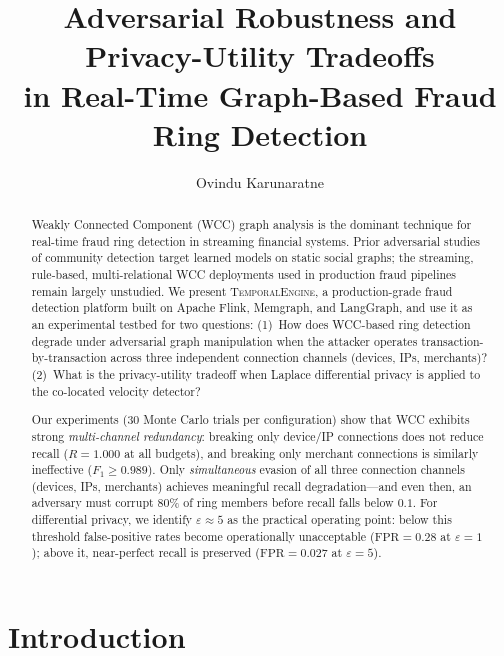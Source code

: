 \documentclass[sigconf,nonacm]{acmart}
\title{Adversarial Robustness and Privacy-Utility Tradeoffs\\
       in Real-Time Graph-Based Fraud Ring Detection}
\author{Ovindu Karunaratne}
\affiliation{%
  \institution{Independent Research}
  \country{}
}
\newcommand{\sysname}{\textsc{TemporalEngine}\xspace}
\newcommand{\wcc}{\textsc{WCC}\xspace}
\newcommand{\eps}{\varepsilon}
\begin{document}
\begin{abstract}
Weakly Connected Component (\wcc) graph analysis is the dominant technique
for real-time fraud ring detection in streaming financial systems.  Prior
adversarial studies of community detection \cite{li2020adversarial,jia2020certified}
target learned models on static social graphs; the streaming, rule-based,
multi-relational \wcc deployments used in production fraud pipelines remain
largely unstudied.  We present \sysname, a production-grade fraud detection
platform built on Apache Flink, Memgraph, and LangGraph, and use it as an
experimental testbed for two questions:
(1)~How does \wcc-based ring detection degrade under adversarial graph
manipulation when the attacker operates transaction-by-transaction across
three independent connection channels (devices, IPs, merchants)?
(2)~What is the privacy-utility tradeoff when Laplace differential
privacy is applied to the co-located velocity detector?

Our experiments (30 Monte Carlo trials per configuration) show that \wcc
exhibits strong \emph{multi-channel redundancy}: breaking only device/IP
connections does not reduce recall ($R = 1.000$ at all budgets), and
breaking only merchant connections is similarly ineffective ($F_1 \geq
0.989$).  Only \emph{simultaneous} evasion of all three connection channels
(devices, IPs, merchants) achieves meaningful recall degradation---and even
then, an adversary must corrupt 80\% of ring members before recall falls
below $0.1$.  For differential privacy, we identify $\eps \approx 5$ as the
practical operating point: below this threshold false-positive rates become
operationally unacceptable ($\mathrm{FPR} = 0.28$ at $\eps=1$); above it,
near-perfect recall is preserved ($\mathrm{FPR} = 0.027$ at $\eps=5$).
\end{abstract}


\maketitle

\section{Introduction}
\end{document}
